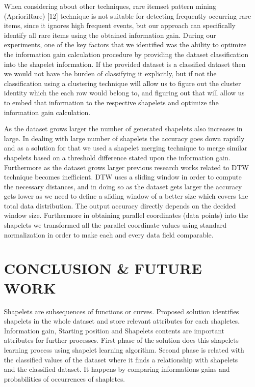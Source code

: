 \documentclass[letterpaper, 10 pt, conference]{IEEEtran}  %
\begin{document}
When considering about other techniques, rare itemset pattern mining (AprioriRare) [12] technique is not suitable for detecting frequently occurring rare items, since it ignores high frequent events, but our approach can specifically identify all rare items using the obtained information gain. During our experiments, one of the key factors that we identified was the ability to optimize the information gain calculation procedure by providing the dataset classification into the shapelet information. If the provided dataset is a classified dataset then we would not have the burden of classifying it explicitly, but if not the classification using a clustering technique will allow us to figure out the cluster identity which the each row would belong to, and figuring out that will allow us to embed that information to the respective shapelets and optimize the information gain calculation. 

As the dataset grows larger the number of generated shapelets also increases in large. In dealing with large number of shapelets the accuracy goes down rapidly and as a solution for that we used a shapelet merging technique to merge similar shapelets based on a threshold difference stated upon the information gain. Furthermore as the dataset grows larger previous research works related to DTW technique becomes inefficient. DTW uses a sliding window in order to compute the necessary distances, and in doing so as the dataset gets larger the accuracy gets lower as we need to define a sliding window of a better size which covers the total data distribution. The output accuracy directly depends on the decided window size. Furthermore in obtaining parallel coordinates (data points) into the shapelets we transformed all the parallel coordinate values using standard normalization in order to make each and every data field comparable. 



\section{CONCLUSION \& FUTURE WORK}

Shapelets are subsequences of functions or curves. Proposed solution identifies shapelets in the whole dataset and store relevant attributes for each shapletes. Information gain, Starting position and Shapelets contents are important attributes for further processes. First phase of the solution does this shapelets learning process using shapelet learning algorithm. Second phase is related with the classified values of the dataset where it finds a relationship with shapelets and the classified dataset. It happens by comparing informations gains and probabilities of occurrences of shapletes.  
\end{document}
